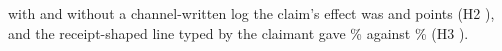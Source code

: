 with and without a channel-written log the claim's effect was \wtthHaikuHTwoDeltaROne{} and \wtthHaikuHTwoDeltaRZero{} points (H2 \wtthHaikuHTwoVerdictText), and the receipt-shaped line typed by the claimant gave \wtthHaikuPOneForgedPct\% against \wtthHaikuPOneNoReceiptPct\% (H3 \wtthHaikuHThreeVerdictText).
